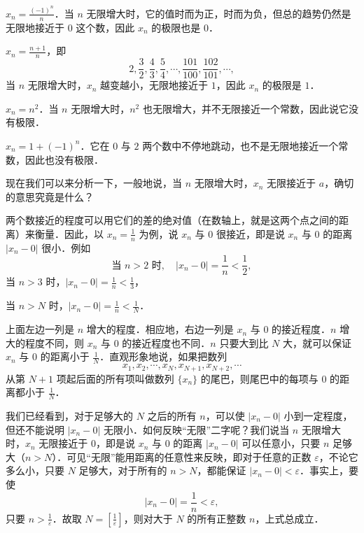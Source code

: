 \begin{example}\label{ex:3-2-2}
$x_n = \frac{(-1)^n}{n}$．当 $n$ 无限增大时，它的值时而为正，时而为负，但总的趋势仍然是无限地接近于 $0$ 这个数，因此 $x_n$ 的极限也是 $0$．
\end{example}

\begin{example}\label{ex:3-2-3}
$x_n = \frac{n+1}{n}$，即
\[
2, \frac{3}{2}, \frac{4}{3}, \frac{5}{4}, \cdots, \frac{101}{100}, \frac{102}{101}, \cdots,
\]
当 $n$ 无限增大时，$x_n$ 越变越小，无限地接近于 $1$，因此 $x_n$ 的极限是 $1$．
\end{example}

\begin{example}\label{ex:3-2-4}
$x_n = n^2$．当 $n$ 无限增大时，$n^2$ 也无限增大，并不无限接近一个常数，因此说它没有极限．
\end{example}

\begin{example}\label{ex:3-2-5}
$x_n = 1+(-1)^n$．它在 $0$ 与 $2$ 两个数中不停地跳动，也不是无限地接近一个常数，因此也没有极限．
\end{example}

现在我们可以来分析一下，一般地说，当 $n$ 无限增大时，$x_n$ 无限接近于 $a$，确切的意思究竟是什么？

两个数接近的程度可以用它们的差的绝对值（在数轴上，就是这两个点之间的距离）来衡量．因此，以 $x_n = \frac{1}{n}$ 为例，说 $x_n$ 与 $0$ 很接近，即是说 $x_n$ 与 $0$ 的距离 $|x_n - 0|$ 很小．例如
\[
\text{当 } n>2 \text{ 时},\quad |x_n - 0| = \frac{1}{n} < \frac{1}{2},
\]
当 $n>3$ 时，$|x_n - 0| = \frac{1}{n} < \frac{1}{3}$，

当 $n>N$ 时，$|x_n - 0| = \frac{1}{n} < \frac{1}{N}$．

上面左边一列是 $n$ 增大的程度．相应地，右边一列是 $x_n$ 与 $0$ 的接近程度．$n$ 增大的程度不同，则 $x_n$ 与 $0$ 的接近程度也不同．$n$ 只要大到比 $N$ 大，就可以保证 $x_n$ 与 $0$ 的距离小于 $\frac{1}{N}$．直观形象地说，如果把数列
\[
x_1, x_2, \cdots, x_N, x_{N+1}, x_{N+2}, \cdots
\]
从第 $N+1$ 项起后面的所有项叫做数列 $\{x_n\}$ 的尾巴，则尾巴中的每项与 $0$ 的距离都小于 $\frac{1}{N}$．

我们已经看到，对于足够大的 $N$ 之后的所有 $n$，可以使 $|x_n - 0|$ 小到一定程度，但还不能说明 $|x_n - 0|$ 无限小．如何反映``无限''二字呢？我们说当 $n$ 无限增大时，$x_n$ 无限接近于 $0$，即是说 $x_n$ 与 $0$ 的距离 $|x_n - 0|$ 可以任意小，只要 $n$ 足够大（$n > N$）．可见``无限''能用距离的任意性来反映，即对于任意的正数 $\varepsilon$，不论它多么小，只要 $N$ 足够大，对于所有的 $n > N$，都能保证 $|x_n - 0| < \varepsilon$．事实上，要使
\[
|x_n - 0| = \frac{1}{n} < \varepsilon,
\]
只要 $n > \frac{1}{\varepsilon}$．故取 $N = \left[\frac{1}{\varepsilon}\right]$，则对大于 $N$ 的所有正整数 $n$，上式总成立．

